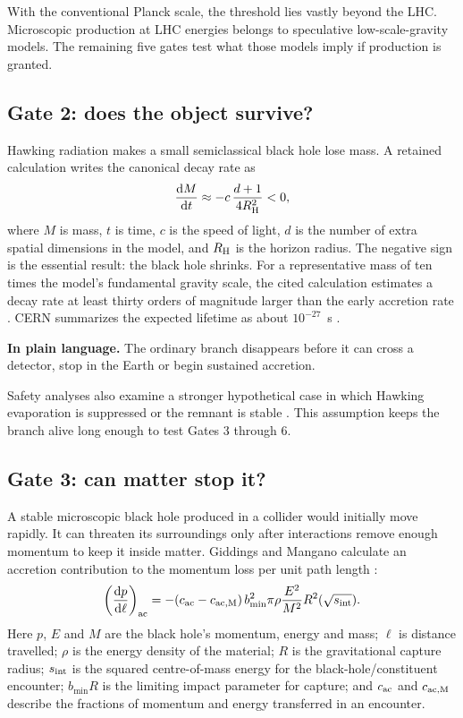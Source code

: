 \documentclass[11pt]{article}
\newcommand{\ud}{\mathrm{d}}
\newcommand{\plainmeaning}[1]{%
  \par\smallskip\noindent\begingroup\setlength{\fboxsep}{8pt}%
  \colorbox{plainbg}{\parbox{\dimexpr\linewidth-2\fboxsep\relax}{\textbf{In plain language.} #1}}%
  \endgroup\par\smallskip}
\begin{document}
With the conventional Planck scale, the threshold lies vastly beyond the LHC. Microscopic production at LHC energies belongs to speculative low-scale-gravity models. The remaining five gates test what those models imply if production is granted.

\subsection{Gate 2: does the object survive?}

Hawking radiation makes a small semiclassical black hole lose mass. A retained calculation writes the canonical decay rate as \cite{Koch2008}
\begin{equation}
\frac{\ud M}{\ud t}\approx-c\,\frac{d+1}{4R_{\rm H}^{2}}<0,
\label{eq:evaporation}
\end{equation}
where $M$ is mass, $t$ is time, $c$ is the speed of light, $d$ is the number of extra spatial dimensions in the model, and $R_{\rm H}$ is the horizon radius. The negative sign is the essential result: the black hole shrinks. For a representative mass of ten times the model's fundamental gravity scale, the cited calculation estimates a decay rate at least thirty orders of magnitude larger than the early accretion rate \cite{Koch2008}. CERN summarizes the expected lifetime as about $10^{-27}$~s \cite{CERNExtraDimensions}.

\plainmeaning{The ordinary branch disappears before it can cross a detector, stop in the Earth or begin sustained accretion.}

Safety analyses also examine a stronger hypothetical case in which Hawking evaporation is suppressed or the remnant is stable \cite{GiddingsMangano2008,Plaga2008,Casadio2009}. This assumption keeps the branch alive long enough to test Gates 3 through 6.

\subsection{Gate 3: can matter stop it?}

A stable microscopic black hole produced in a collider would initially move rapidly. It can threaten its surroundings only after interactions remove enough momentum to keep it inside matter. Giddings and Mangano calculate an accretion contribution to the momentum loss per unit path length \cite{GiddingsMangano2008}:
\begin{equation}
\left(\frac{\ud p}{\ud\ell}\right)_{\rm ac}
=-(c_{\rm ac}-c_{\rm ac,M})\,b_{\min}^{2}\pi\rho
\frac{E^{2}}{M^{2}}R^{2}(\sqrt{s_{\rm int}}).
\label{eq:stopping}
\end{equation}
Here $p$, $E$ and $M$ are the black hole's momentum, energy and mass; $\ell$ is distance travelled; $\rho$ is the energy density of the material; $R$ is the gravitational capture radius; $s_{\rm int}$ is the squared centre-of-mass energy for the black-hole/constituent encounter; $b_{\min}R$ is the limiting impact parameter for capture; and $c_{\rm ac}$ and $c_{\rm ac,M}$ describe the fractions of momentum and energy transferred in an encounter.
\end{document}
